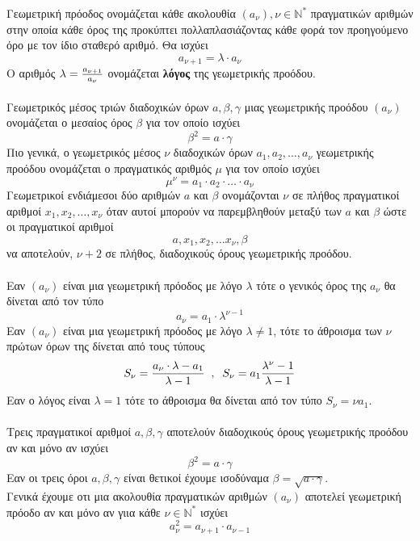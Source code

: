 \documentclass[twoside,nofonts,internet,shmeiwseis]{thewria}
\DeclareRobustCommand{\frac}[3][0pt]{%
{\begingroup\hspace{#1}#2\hspace{#1}\endgroup\over\hspace{#1}#3\hspace{#1}}}
\begin{document}
\orismoi
{}
Γεωμετρική πρόοδος ονομάζεται κάθε ακολουθία $ (a_\nu),\nu\in\mathbb{N}^* $ πραγματικών αριθμών στην οποία κάθε όρος της προκύπτει πολλαπλασιάζοντας κάθε φορά τον προηγούμενο όρο με τον ίδιο σταθερό αριθμό. Θα ισχύει
\[ a_{\nu+1}=\lambda\cdot a_\nu \]
Ο αριθμός $ \lambda=\frac{a_{\nu+1}}{a_\nu} $ ονομάζεται \textbf{λόγος} της γεωμετρικής προόδου.\\\\
Γεωμετρικός μέσος τριών διαδοχικών όρων $ a,\beta,\gamma $ μιας γεωμετρικής προόδου $ (a_\nu) $ ονομάζεται ο μεσαίος όρος $ \beta $ για τον οποίο ισχύει \[ \beta^2=a\cdot\gamma \]
Πιο γενικά, ο γεωμετρικός μέσος $ \nu $ διαδοχικών όρων $ a_1,a_2,\ldots,a_\nu $ γεωμετρικής προόδου ονομάζεται ο πραγματικός αριθμός $ \mu $ για τον οποίο ισχύει \[ \mu^\nu=a_1\cdot a_2\cdot\ldots\cdot a_\nu \]
Γεωμετρικοί ενδιάμεσοι δύο αριθμών $ a $ και $ \beta $ ονομάζονται $\nu$ σε πλήθος πραγματικοί αριθμοί $ x_1,x_2,\ldots,x_\nu $ όταν αυτοί μπορούν να παρεμβληθούν μεταξύ των $ a $ και $ \beta $ ώστε οι πραγματικοί αριθμοί \[ a,x_1,x_2,\ldots x_\nu,\beta \] να αποτελούν, $ \nu+2 $ σε πλήθος, διαδοχικούς όρους γεωμετρικής προόδου.\\\\
\thewrhmata
{}
Εαν $ (a_\nu) $ είναι μια γεωμετρική πρόοδος με λόγο $ \lambda $ τότε ο γενικός όρος της $ a_\nu $ θα δίνεται από τον τύπο \[ a_\nu=a_1\cdot\lambda^{\nu-1} \]
Εαν $ (a_\nu) $ είναι μια γεωμετρική πρόοδος με λόγο $ \lambda\neq1 $, τότε το άθροισμα των $ \nu $ πρώτων όρων της δίνεται από τους τύπους
\[ S_\nu=\dfrac{a_\nu\cdot\lambda-a_1}{\lambda-1}\;\;,\;\;S_\nu=a_1\frac{\lambda^\nu-1}{\lambda-1} \]
Εαν ο λόγος είναι $ \lambda=1 $ τότε το άθροισμα θα δίνεται από τον τύπο $ S_\nu=\nu a_1 $.\\\\
Τρεις πραγματικοί αριθμοί $ a,\beta,\gamma $ αποτελούν διαδοχικούς όρους γεωμετρικής προόδου αν και μόνο αν ισχύει \[ \beta^2=a\cdot\gamma \]
Εαν οι τρεις όροι $ a,\beta,\gamma $ είναι θετικοί έχουμε ισοδύναμα $ \beta=\!\sqrt{a\cdot\gamma} $.\\
Γενικά έχουμε οτι μια ακολουθία πραγματικών αριθμών $ (a_\nu) $ αποτελεί γεωμετρική πρόοδο αν και μόνο αν γιια κάθε $ \nu\in\mathbb{N}^* $ ισχύει \[ a_\nu^2=a_{\nu+1}\cdot a_{\nu-1} \]
\end{document}
